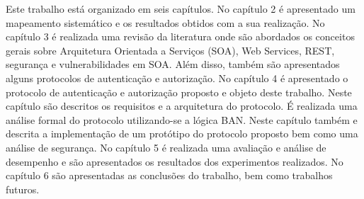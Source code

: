 Este trabalho está organizado em seis capítulos. No capítulo 2 é apresentado um mapeamento sistemático e os resultados obtidos com a sua realização. No capítulo 3 é realizada uma revisão da literatura onde são abordados os conceitos gerais sobre Arquitetura Orientada a Serviços (SOA), Web Services, REST, segurança e vulnerabilidades em SOA. Além disso, também são apresentados alguns protocolos de autenticação e autorização. No capítulo 4 é apresentado o protocolo de autenticação e autorização proposto e objeto deste trabalho. Neste capítulo são descritos os requisitos e a arquitetura do protocolo. É realizada uma análise formal do protocolo utilizando-se a lógica BAN. Neste capítulo também e descrita a implementação de um protótipo do protocolo proposto bem como uma análise de segurança. No capítulo 5 é realizada uma avaliação e análise de desempenho e são apresentados os resultados dos experimentos realizados. No capítulo 6 são apresentadas as conclusões do trabalho, bem como trabalhos futuros. 